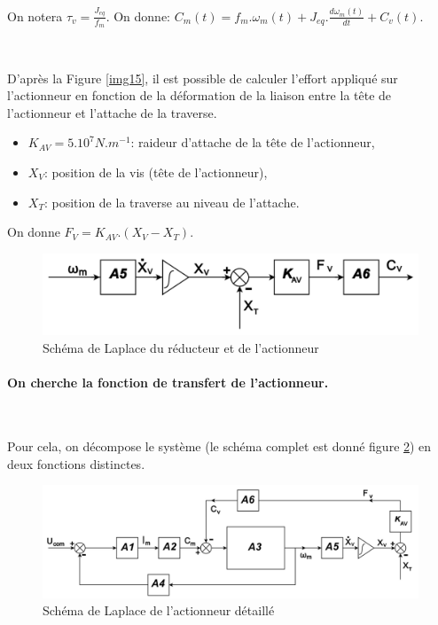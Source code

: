 On notera $\tau_v=\frac{J_{eq}}{f_m}$. On donne: $C_m(t)=f_m.\omega_m(t)+J_{eq}.\frac{d\omega_m(t)}{dt}+C_v(t)$.


~\

D'après la Figure \ref{img15}, il est possible de calculer l'effort appliqué sur l'actionneur en fonction de la déformation de la liaison entre la tête de l'actionneur et l'attache de la traverse.

\begin{itemize}
 \item $K_{AV} = 5.10^7 N.m^{-1}$: raideur d'attache de la tête de l'actionneur,
 \item $X_V$: position de la vis (tête de l'actionneur),
 \item $X_T$: position de la traverse au niveau de l'attache. 
\end{itemize}

On donne $F_V=K_{AV}.(X_V-X_T)$.


\begin{figure}[!h]
 \centering\includegraphics[width=0.5\linewidth]{img/fig19}
 \caption{Schéma de Laplace du réducteur et de l'actionneur}
 \label{img19}
\end{figure}

\paragraph{On cherche la fonction de transfert de l'actionneur.}

~\

Pour cela, on décompose le système (le schéma complet est donné figure \ref{img20}) en deux fonctions distinctes.


\begin{figure}[!h]
 \centering\includegraphics[width=0.8\linewidth]{img/fig20}
 \caption{Schéma de Laplace de l'actionneur détaillé}
 \label{img20}
\end{figure}

